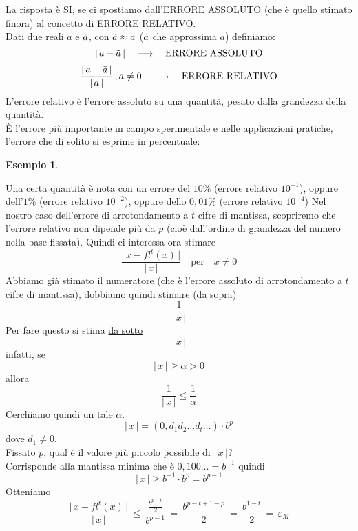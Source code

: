 \documentclass[12pt]{article}
\newtheorem*{esempio}{Esempio}
\begin{document}
La risposta è SI, se ci spostiamo dall'ERRORE ASSOLUTO (che è quello stimato finora) al concetto di ERRORE RELATIVO. \\
Dati due reali $a$ e $\Tilde{a}$, con $\Tilde{a} \approx a$ ($\Tilde{a}$ che approssima $a$) definiamo:
\[ \lvert \, a - \Tilde{a} \, \rvert \quad \longrightarrow \quad \text{ERRORE ASSOLUTO}\]
\[ \frac{\lvert \, a - \Tilde{a} \, \rvert}{\lvert \, a \, \rvert} \, , a \ne 0 \quad \longrightarrow \quad \text{ERRORE RELATIVO} \]
L'errore relativo è l'errore assoluto su una quantità, \uline{pesato dalla grandezza} della quantità. \\
È l'errore più importante in campo sperimentale e nelle applicazioni pratiche, l'errore che di solito si esprime in \uline{percentuale}:
\begin{esempio} \end{esempio}
Una certa quantità è nota con un errore del $10\%$ (errore relativo $10^{-1}$), oppure dell'$1\%$ (errore relativo $10^{-2}$), oppure dello $0,01\%$ (errore relativo $10^{-4}$)
\newline \newline
Nel nostro caso dell'errore di arrotondamento a $t$ cifre di mantissa, scopriremo che l'errore relativo non dipende più da $p$ (cioè dall'ordine di grandezza del numero nella base fissata). Quindi ci interessa ora stimare
\[ \frac{\lvert \, x - fl^t(x) \, \rvert}{\lvert \, x \, \rvert} \quad \text{per}\quad x \ne 0 \]
Abbiamo già stimato il numeratore (che è l'errore assoluto di arrotondamento a $t$ cifre di mantissa), dobbiamo quindi stimare (da sopra) \[ \frac{1}{\lvert \, x  \, \rvert} \]
Per fare questo si stima \uline{da sotto} \[ \lvert \, x \, \rvert \]
infatti, se \[ \lvert \, x \, \rvert \ge \alpha > 0 \] allora 
\[ \frac{1}{\lvert \, x \, \rvert} \le \frac{1}{\alpha} \]
Cerchiamo quindi un tale $\alpha$.
\[ \lvert \, x \, \rvert = (0,d_1 d_2 \dotsc d_t \dotsc ) \cdot b^p \] dove $d_1 \ne 0$. \\
Fissato $p$, qual è il valore più piccolo possibile di $\lvert \, x \, \rvert$? \\
Corrisponde alla mantissa minima che è $0,100 \dotsc = b^{-1}$ quindi
\[ \lvert \, x \, \rvert \ge b^{-1} \cdot b^p = b^{p-1} \] Otteniamo
\[ \frac{\lvert \, x - fl^t(x) \, \rvert}{\lvert \, x \, \rvert} \, \le \, \frac{\frac{b^{p-t}}{2}}{b^{p-1}} \,=\, \frac{b^{p-t+1-p}}{2} \,=\, \frac{b^{1-t}}{2} \,=\, \varepsilon_M\]
\end{document}

